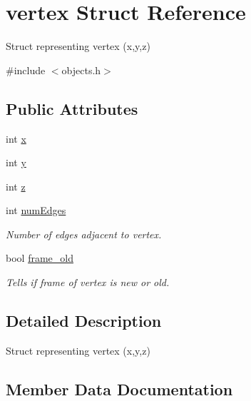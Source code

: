 \hypertarget{structvertex}{}\section{vertex Struct Reference}
\label{structvertex}


Struct representing vertex (x,y,z)  




{\ttfamily \#include $<$objects.\+h$>$}

\subsection*{Public Attributes}
\begin{DoxyCompactItemize}
\item 
int \mbox{\hyperlink{structvertex_a170e80128423a8b3307dd7908fc7564c}{x}}
\item 
int \mbox{\hyperlink{structvertex_adc996af0584614ec01cdf8f23bdafc7b}{y}}
\item 
int \mbox{\hyperlink{structvertex_a759224f594ddf22da9027decd6f90df0}{z}}
\item 
int \mbox{\hyperlink{structvertex_ae3c22df6081de2e3344055db29ae5b10}{num\+Edges}}
\begin{DoxyCompactList}\small\item\em Number of edges adjacent to vertex. \end{DoxyCompactList}\item 
bool \mbox{\hyperlink{structvertex_aa9a12b9c9f346574ef1d0ca8bb707660}{frame\+\_\+old}}
\begin{DoxyCompactList}\small\item\em Tells if frame of vertex is new or old. \end{DoxyCompactList}\end{DoxyCompactItemize}


\subsection{Detailed Description}
Struct representing vertex (x,y,z) 

\subsection{Member Data Documentation}
\mbox{\label{structvertex_aa9a12b9c9f346574ef1d0ca8bb707660}} 
